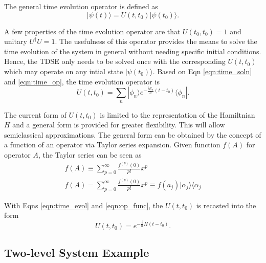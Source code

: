 \documentclass{article}
\begin{document}
The general time evolution operator is defined as
\begin{equation}
  |\psi(t)\rangle = U(t,t_0)|\psi(t_0)\rangle.
  \label{eqn:time_op}
\end{equation}

A few properties of the time evolution operator are that $U(t_0,t_0)=1$
and unitary $U^{\dagger}U=1$. The usefulness of this operator provides the means to solve the
time evolution of the system in general without needing specific initial conditions.
Hence, the TDSE only needs to be solved once with the corresponding $U(t,t_0)$ which
may operate on any intial state $|\psi(t_0)\rangle$. Based on Eqn \eqref{eqn:time_soln} and
\eqref{eqn:time_op}, the time evolution operator is
\begin{equation}
  U(t,t_0) = \sum_n|\phi_n\rangle e^{-\frac{iE_n}{\hbar}(t-t_0)}\langle\phi_n|.
  \label{eqn:time_evol}
\end{equation}

The current form of $U(t,t_0)$ is limited to the representation of the Hamiltnian $H$
and a general form is provided for greater flexibility. This will allow semiclassical
approximations. The general form can be obtained by the concept of a function of an
operator via Taylor series expansion. Given function $f(A)$ for operator $A$, the Taylor
series can be seen as
\begin{align}
  f(A) \equiv \sum^{\infty}_{p=0}\frac{f^{(p)}(0)}{p!}x^p \\
  f(A) = \sum^{\infty}_{p=0}\frac{f^{(p)}(0)}{p!}x^p \equiv f(a_j)|\alpha_j\rangle\langle\alpha_j
  \label{eqn:op_func}
\end{align}

With Eqns \eqref{eqn:time_evol} and \eqref{eqn:op_func}, the $U(t,t_0)$ is recasted into the form
\begin{equation}
  U(t,t_0) = e^{-\frac{i}{\hbar}H(t-t_0)}.
\end{equation}

\subsection{Two-level System Example}
\end{document}
